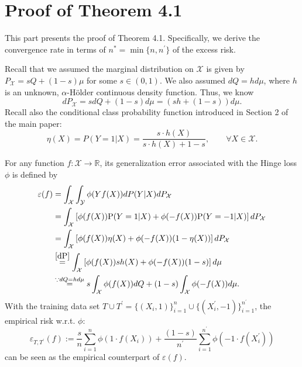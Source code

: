 \documentclass{article}
\def\RR{\mathbb R}
\begin{document}
\section{Proof of Theorem 4.1}
\label{appendix:proof_thm_1_excess_risk}
This part presents the proof of Theorem 4.1. Specifically, we derive the convergence rate in terms of $n^* = \min\{n, n^\prime\}$ of the excess risk.

Recall that we assumed the marginal distribution on $\mathcal{X}$ is given by $P_\mathcal{X} = sQ + (1-s)\mu$ for some $s \in (0,1)$. We also assumed $dQ = hd\mu$, where $h$ is an unknown, $\alpha$-Hölder continuous density function.
Thus, we know  \begin{equation}\label{dP}
    d P_\mathcal{X} =sdQ + (1-s)d\mu = ( sh + (1-s))d\mu.
\end{equation} 
Recall also the conditional class probability function introduced in Section 2 of the main paper:
\begin{equation*}
    \eta(X)=P(Y=1|X)=\frac{s\cdot h(X)}{s\cdot h(X)+1-s}, \qquad \forall X\in \mathcal{X}.
\end{equation*}

For any function  $f: \mathcal{X} \to \RR$, its generalization error associated with the Hinge loss $\phi$ is defined by
\begin{align*}
    \varepsilon(f) &= \int_{\mathcal{X}} \int_{\mathcal{Y}} \phi(Yf(X)) dP(Y|X) dP_\mathcal{X}   \\ 
    &= \int_{\mathcal{X} } \left[\phi(f(X))\mathrm P(Y=1|X) +  \phi(-f(X))\mathrm P(Y=-1|X) \right]dP_\mathcal{X} \\
    &= \int_{\mathcal{X} } \left[\phi(f(X))\eta(X) +  \phi(-f(X))\mathrm (1-\eta(X))\right]dP_\mathcal{X}\\
    &\stackrel{\eqref{dP}}{=}\int_{\mathcal{X} }  \left[\phi(f(X))sh(X) +  \phi(-f(X))(1-s)\right]d\mu \\
     &\stackrel{\because dQ = hd\mu}{=}s \int_{\mathcal{X} } \phi(f(X))dQ + (1-s)\int_{\mathcal{X} } \phi(-f(X))d\mu.
\end{align*}
With the  training data set $T \cup T^\prime = \{(X_i,1)\}_{i=1}^{n} \cup \{(X_i^\prime,-1)\}_{i=1}^{n^\prime}$, the empirical risk w.r.t. $\phi$:
\begin{equation*}
    \varepsilon_{T,T^\prime} (f):=\frac{s}{n} \sum_{i=1}^{n} \phi\left(1 \cdot f(X_i)\right) + \frac{(1-s) }{n^\prime}\sum_{i=1}^{n^\prime}\phi(-1 \cdot f(X^\prime_i)) 
\end{equation*}
can be seen as the empirical counterpart of $\varepsilon(f)$. 
\end{document}
